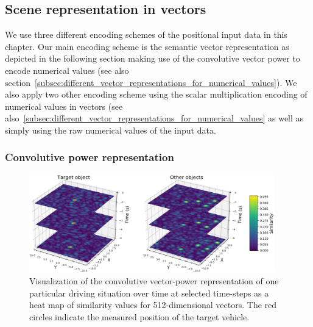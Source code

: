 \subsection{Scene representation in vectors}%
\label{subsec:scene_representation_in_vectors}

We use three different encoding schemes of the positional input data in this chapter.
Our main encoding scheme is the semantic vector representation as depicted in the following section making use of the convolutive vector power to encode numerical values (see also section~\ref{subsec:different_vector_representations_for_numerical_values}).
We also apply two other encoding scheme using the scalar multiplication encoding of numerical values in vectors (see also~\ref{subsec:different_vector_representations_for_numerical_values} as well as simply using the raw numerical values of the input data.

\subsubsection{Convolutive power representation}%
\label{ssubsec:convolutive_power_representation}

\begin{figure}[t!]
  \centering
  \includegraphics[width=0.95\textwidth]{imgs/spa_power_representation_in_time_viridis.eps}
  \caption{Visualization of the convolutive vector-power representation of one particular driving situation over time at selected time-steps as a heat map of similarity values for \num{512}-dimensional vectors. The red circles indicate the measured position of the target vehicle.}\label{fig:spa_power}
\end{figure}


